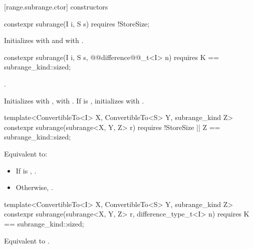 [range.subrange.ctor]{ constructors}

%
\begin{itemdecl}
constexpr subrange(I i, S s) requires !StoreSize;
\end{itemdecl}

\begin{itemdescr}
\pnum
\effects Initializes  with  and  with
.
\end{itemdescr}

%
\begin{itemdecl}
constexpr subrange(I i, S s, @@difference@@_t<I> n)
  requires K == subrange_kind::sized;
\end{itemdecl}

\begin{itemdescr}
\pnum
\requires {}.

\pnum
\effects Initializes  with ,  with
. If  is , initializes  with
.
\end{itemdescr}

{\color{oldclr}
%
\begin{itemdecl}
template<ConvertibleTo<I> X, ConvertibleTo<S> Y, subrange_kind Z>
constexpr subrange(subrange<X, Y, Z> r)
  requires !StoreSize || Z == subrange_kind::sized;
\end{itemdecl}

\begin{itemdescr}
\pnum
\effects Equivalent to:
\begin{itemize}
\item If  is ,
.
\item Otherwise, .
\end{itemize}
\end{itemdescr}

%
\begin{itemdecl}
template<ConvertibleTo<I> X, ConvertibleTo<S> Y, subrange_kind Z>
constexpr subrange(subrange<X, Y, Z> r, difference_type_t<I> n)
  requires K == subrange_kind::sized;
\end{itemdecl}

\begin{itemdescr}
\pnum
\effects Equivalent to .
\end{itemdescr}
} %

